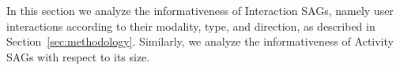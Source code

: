 %   
                

In this section we analyze the informativeness of Interaction SAGs,
namely user interactions according to their modality, type, and direction, 
as described in Section~\ref{sec:methodology}. Similarly, we analyze the 
informativeness of Activity SAGs with respect to its size.

